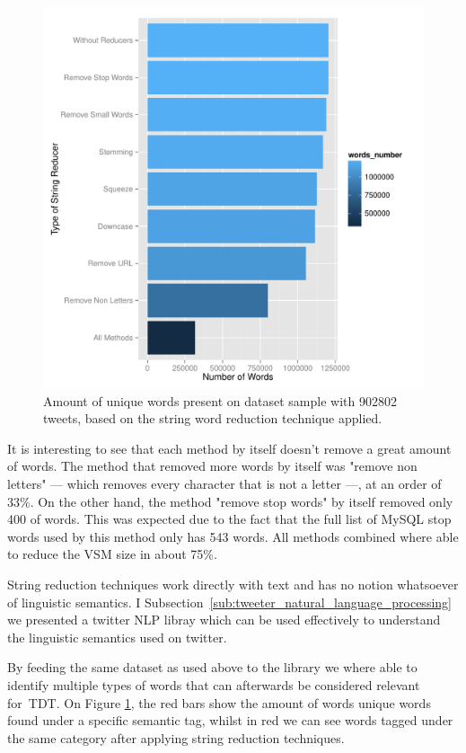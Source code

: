 \begin{figure}[htpb]
  \centering
  \includegraphics[width=0.8\linewidth]{./plots/svm/plot_wordcount.pdf}
  \caption{Amount of unique words present on dataset sample with 902802 tweets, based on the string word reduction technique applied.}
  \label{fig:plot_word_red}
\end{figure}

It is interesting to see that each method by itself doesn't remove a great amount of words. The method that removed more words by itself was "remove non letters" --- which removes every character that is not a letter ---, at an order of 33\%. On the other hand, the method "remove stop words" by itself removed only 400 of words. This was expected due to the fact that the full list of MySQL stop words used by this method only has 543 words. All methods combined where able to reduce the \ac{VSM} size in about 75\%.

String reduction techniques work directly with text and has no notion whatsoever of linguistic semantics. I Subsection~\ref{sub:tweeter_natural_language_processing} we presented a twitter \ac{NLP} libray which can be used effectively to understand the linguistic semantics used on twitter. 

By feeding the same dataset as used above to the library we where able to identify multiple types of words that can afterwards be considered relevant for~\ac{TDT}. On Figure \ref{fig:plot_word_red}, the red bars show the amount of words unique words found under a specific semantic tag, whilst in red we can see words tagged under the same category after applying string reduction techniques.

